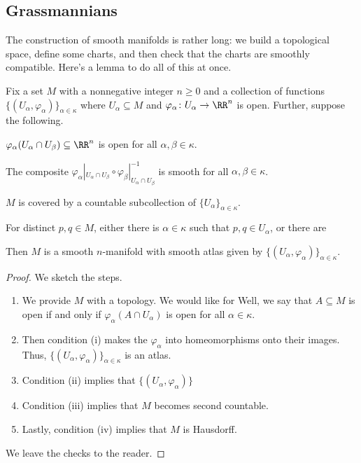 \documentclass[../notes.tex]{subfiles}
\begin{document}
\subsection{Grassmannians}
The construction of smooth manifolds is rather long: we build a topological space, define some charts, and then check that the charts are smoothly compatible. Here's a lemma to do all of this at once.
\begin{lemma} \label{lem:build-manifold-from-set}
	Fix a set $M$ with a nonnegative integer $n\ge0$ and a collection of functions $\{(U_\alpha,\varphi_\alpha)\}_{\alpha\in\kappa}$ where $U_\alpha\subseteq M$ and $\varphi_\alpha\colon U_\alpha\to\RR^n$ is open. Further, suppose the following.
	\begin{listroman}
		\item $\varphi_\alpha(U_\alpha\cap U_\beta)\subseteq\RR^n$ is open for all $\alpha,\beta\in\kappa$.
		\item The composite $\varphi_\alpha|_{U_\alpha\cap U_\beta}\circ\varphi_\beta|_{U_\alpha\cap U_\beta}^{-1}$ is smooth for all $\alpha,\beta\in\kappa$.
		\item $M$ is covered by a countable subcollection of $\{U_\alpha\}_{\alpha\in\kappa}$.
		\item For distinct $p,q\in M$, either there is $\alpha\in\kappa$ such that $p,q\in U_\alpha$, or there are 
	\end{listroman}
	Then $M$ is a smooth $n$-manifold with smooth atlas given by $\{(U_\alpha,\varphi_\alpha)\}_{\alpha\in\kappa}$.
\end{lemma}
\begin{proof}
	We sketch the steps.
	\begin{enumerate}
		\item We provide $M$ with a topology. We would like for Well, we say that $A\subseteq M$ is open if and only if $\varphi_\alpha(A\cap U_\alpha)$ is open for all $\alpha\in\kappa$.
		\item Then condition (i) makes the $\varphi_\alpha$ into homeomorphisms onto their images. Thus, $\{(U_\alpha,\varphi_\alpha)\}_{\alpha\in\kappa}$ is an atlas.
		\item Condition (ii) implies that $\{(U_\alpha,\varphi_\alpha)\}$
		\item Condition (iii) implies that $M$ becomes second countable.
		\item Lastly, condition (iv) implies that $M$ is Hausdorff.
	\end{enumerate}
	We leave the checks to the reader.
\end{proof}
\end{document}
